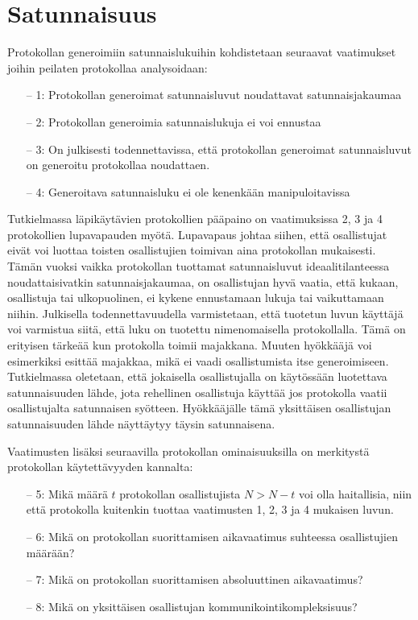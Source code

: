 \section{Satunnaisuus}

Protokollan generoimiin satunnaislukuihin kohdistetaan seuraavat vaatimukset joihin peilaten protokollaa analysoidaan:
\begin{itemize}
    \item[--] 1: Protokollan generoimat satunnaisluvut noudattavat satunnaisjakaumaa
    \item[--] 2: Protokollan generoimia satunnaislukuja ei voi ennustaa
    \item[--] 3: On julkisesti todennettavissa, että protokollan generoimat satunnaisluvut on generoitu protokollaa noudattaen.
    \item[--] 4: Generoitava satunnaisluku ei ole kenenkään manipuloitavissa
\end{itemize}\textbf{}

Tutkielmassa läpikäytävien protokollien pääpaino on vaatimuksissa 2, 3 ja 4 protokollien lupavapauden myötä. Lupavapaus johtaa siihen, että osallistujat eivät voi luottaa toisten osallistujien toimivan aina protokollan mukaisesti. Tämän vuoksi vaikka protokollan tuottamat satunnaisluvut ideaalitilanteessa noudattaisivatkin satunnaisjakaumaa, on osallistujan hyvä vaatia, että kukaan, osallistuja tai ulkopuolinen, ei kykene ennustamaan lukuja tai vaikuttamaan niihin. Julkisella todennettavuudella varmistetaan, että 
tuotetun luvun käyttäjä voi varmistua siitä, että luku on tuotettu nimenomaisella protokollalla. Tämä on erityisen tärkeää kun protokolla toimii majakkana. Muuten hyökkääjä voi esimerkiksi esittää majakkaa, mikä ei vaadi osallistumista itse generoimiseen. Tutkielmassa oletetaan, että jokaisella osallistujalla on käytössään luotettava satunnaisuuden lähde, jota rehellinen osallistuja käyttää jos protokolla vaatii osallistujalta satunnaisen syötteen. Hyökkääjälle tämä yksittäisen osallistujan satunnaisuuden lähde näyttäytyy täysin satunnaisena.

Vaatimusten lisäksi seuraavilla protokollan ominaisuuksilla on merkitystä protokollan käytettävyyden kannalta:

\begin{itemize}
    \item[--] 5: Mikä määrä $t$ protokollan osallistujista $N > N - t$ voi olla haitallisia, niin että protokolla kuitenkin tuottaa vaatimusten 1, 2, 3 ja 4 mukaisen luvun.
    \item[--] 6: Mikä on protokollan suorittamisen aikavaatimus suhteessa osallistujien määrään?
    \item[--] 7: Mikä on protokollan suorittamisen absoluuttinen aikavaatimus?
    \item[--] 8: Mikä on yksittäisen osallistujan kommunikointikompleksisuus?
\end{itemize}